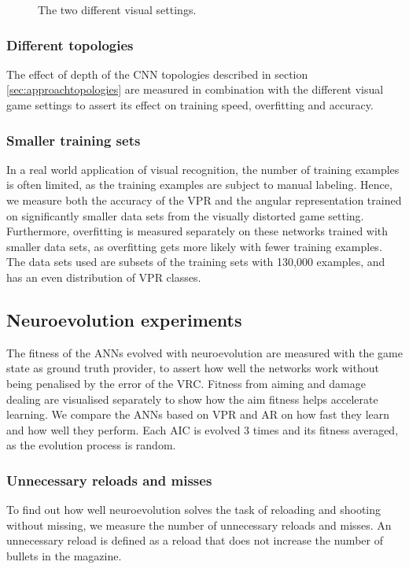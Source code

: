 \begin{figure}[H]
	\begin{scriptsize}
		
	\end{scriptsize}
	\caption{The two different visual settings.}
	\label{fig:light}
\end{figure}

\subsubsection{Different topologies}
The effect of depth of the CNN topologies described in section \ref{sec:approachtopologies} are measured in combination with the different visual game settings to assert its effect on training speed, overfitting and accuracy.

\subsubsection{Smaller training sets}
In a real world application of visual recognition, the number of training examples is often limited, as the training examples are subject to manual labeling. Hence, we measure both the accuracy of the VPR and the angular representation trained on significantly smaller data sets from the visually distorted game setting. Furthermore, overfitting is measured separately on these networks trained with smaller data sets, as overfitting gets more likely with fewer training examples. The data sets used are subsets of the training sets with 130,000 examples, and has an even distribution of VPR classes.

 
\subsection{Neuroevolution experiments}
The fitness of the ANNs evolved with neuroevolution are measured with the game state as ground truth provider, to assert how well the networks work without being penalised by the error of the VRC. Fitness from aiming and damage dealing are visualised separately to show how the aim fitness helps accelerate learning. We compare the ANNs based on VPR and AR on how fast they learn and how well they perform. Each AIC is evolved 3 times and its fitness averaged, as the evolution process is random.

\subsubsection{Unnecessary reloads and misses}
To find out how well neuroevolution solves the task of reloading and shooting without missing, we measure the number of unnecessary reloads and misses. An unnecessary reload is defined as a reload that does not increase the number of bullets in the magazine.









